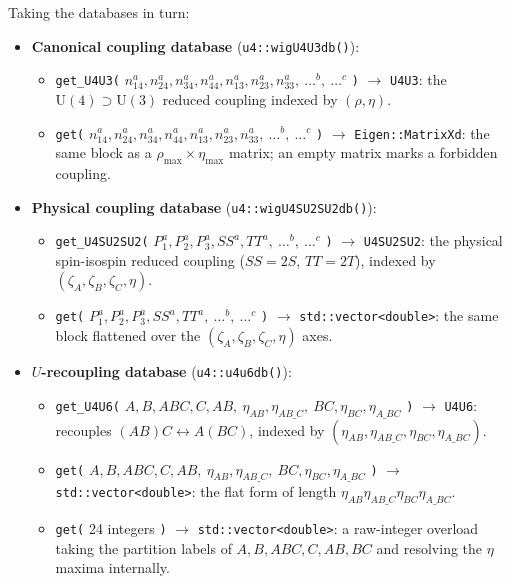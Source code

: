 \documentclass[aps,onecolumn,10pt,superscriptaddress,floatfix,nofootinbib]{revtex4}
\begin{document}
Taking the databases in turn:
\begin{itemize}
    \item \textbf{Canonical coupling database} (\verb|u4::wigU4U3db()|):
    \begin{itemize}
        \item \verb|get_U4U3(| $n_{14}^a,n_{24}^a,n_{34}^a,n_{44}^a,n_{13}^a,n_{23}^a,n_{33}^a,\ \dots^{b},\ \dots^{c}$ \verb|)| $\to$ \verb|U4U3|: the $\mathrm{U(4)}\supset\mathrm{U(3)}$ reduced coupling indexed by $(\rho,\eta)$. %
        \item \verb|get(| $n_{14}^a,n_{24}^a,n_{34}^a,n_{44}^a,n_{13}^a,n_{23}^a,n_{33}^a,\ \dots^{b},\ \dots^{c}$ \verb|)| $\to$ \verb|Eigen::MatrixXd|: the same block as a $\rho_{\max}\times\eta_{\max}$ matrix; an empty matrix marks a forbidden coupling.
    \end{itemize}

    \item \textbf{Physical coupling database} (\verb|u4::wigU4SU2SU2db()|):
    \begin{itemize}
        \item \verb|get_U4SU2SU2(| $P_1^a,P_2^a,P_3^a,SS^a,TT^a,\ \dots^{b},\ \dots^{c}$ \verb|)| $\to$ \verb|U4SU2SU2|: the physical spin-isospin reduced coupling ($SS=2S$, $TT=2T$), indexed by $(\zeta_A,\zeta_B,\zeta_C,\eta)$.
        \item \verb|get(| $P_1^a,P_2^a,P_3^a,SS^a,TT^a,\ \dots^{b},\ \dots^{c}$ \verb|)| $\to$ \verb|std::vector<double>|: the same block flattened over the $(\zeta_A,\zeta_B,\zeta_C,\eta)$ axes.
    \end{itemize}

    \item \textbf{$U$-recoupling database} (\verb|u4::u4u6db()|):
    \begin{itemize}
        \item \verb|get_U4U6(| $A,B,ABC,C,AB,\ \eta_{AB},\eta_{AB\_C},\ BC,\eta_{BC},\eta_{A\_BC}$ \verb|)| $\to$ \verb|U4U6|: recouples $(AB)C\leftrightarrow A(BC)$, indexed by $(\eta_{AB},\eta_{AB\_C},\eta_{BC},\eta_{A\_BC})$.%
        \item \verb|get(| $A,B,ABC,C,AB,\ \eta_{AB},\eta_{AB\_C},\ BC,\eta_{BC},\eta_{A\_BC}$ \verb|)| $\to$ \verb|std::vector<double>|: the flat form of length $\eta_{AB}\eta_{AB\_C}\eta_{BC}\eta_{A\_BC}$.
        \item \verb|get(| 24 integers \verb|)| $\to$ \verb|std::vector<double>|: a raw-integer overload taking the partition labels of $A,B,ABC,C,AB,BC$ and resolving the $\eta$ maxima internally.
    \end{itemize}


\end{itemize}
\end{document}
